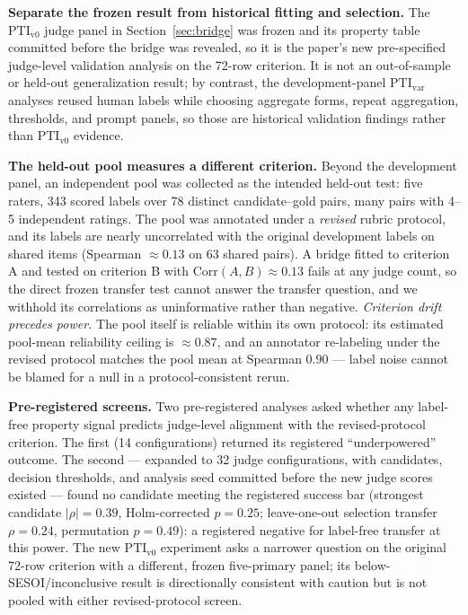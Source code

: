 \documentclass{article}
\newcommand{\PTI}{\mathrm{PTI}}                  %
\newcommand{\PTIvzero}{\PTI_{\mathrm{v0}}}        %
\newcommand{\PTIvar}{\PTI_{\mathrm{var}}}        %
\begin{document}
\textbf{Separate the frozen result from historical fitting and selection.}
The $\PTIvzero$ judge panel in Section~\ref{sec:bridge} was frozen and its property table committed before the bridge was revealed, so it is the paper's new pre-specified judge-level validation analysis on the 72-row criterion.
It is not an out-of-sample or held-out generalization result; by contrast, the development-panel $\PTIvar$ analyses reused human labels while choosing aggregate forms, repeat aggregation, thresholds, and prompt panels, so those are historical validation findings rather than $\PTIvzero$ evidence.

\textbf{The held-out pool measures a different criterion.}
Beyond the development panel, an independent pool was collected as the intended held-out test: five raters, 343 scored labels over 78 distinct candidate--gold pairs, many pairs with 4--5 independent ratings.
The pool was annotated under a \emph{revised} rubric protocol, and its labels are nearly uncorrelated with the original development labels on shared items (Spearman $\approx 0.13$ on 63 shared pairs).
A bridge fitted to criterion A and tested on criterion B with $\mathrm{Corr}(A,B) \approx 0.13$ fails at any judge count, so the direct frozen transfer test cannot answer the transfer question, and we withhold its correlations as uninformative rather than negative.
\emph{Criterion drift precedes power.}
The pool itself is reliable within its own protocol: its estimated pool-mean reliability ceiling is $\approx 0.87$, and an annotator re-labeling under the revised protocol matches the pool mean at Spearman $0.90$ --- label noise cannot be blamed for a null in a protocol-consistent rerun.

\textbf{Pre-registered screens.}
Two pre-registered analyses asked whether any label-free property signal predicts judge-level alignment with the revised-protocol criterion.
The first (14 configurations) returned its registered ``underpowered'' outcome.
The second --- expanded to 32 judge configurations, with candidates, decision thresholds, and analysis seed committed before the new judge scores existed --- found no candidate meeting the registered success bar (strongest candidate $|\rho|=0.39$, Holm-corrected $p=0.25$; leave-one-out selection transfer $\rho=0.24$, permutation $p=0.49$): a registered negative for label-free transfer at this power.
The new $\PTIvzero$ experiment asks a narrower question on the original 72-row criterion with a different, frozen five-primary panel; its below-SESOI/inconclusive result is directionally consistent with caution but is not pooled with either revised-protocol screen.
\end{document}
